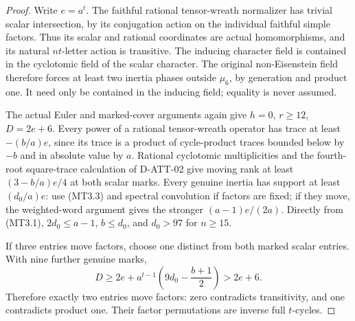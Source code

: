 \begin{proof}
Write $e=a^t$. The faithful rational tensor-wreath normalizer
has trivial scalar intersection, by its conjugation action
on the individual faithful simple factors. Thus its scalar
and rational coordinates are actual homomorphisms, and its
natural $nt$-letter action is transitive. The inducing
character field is contained in the cyclotomic field of
the scalar character. The original non-Eisenstein field
therefore forces at least two inertia phases outside $\mu_6$,
by generation and product one. It need only be contained
in the inducing field; equality is never assumed.

The actual Euler and marked-cover arguments again give
$h=0$, $r\ge12$, $D=2e+6$.
Every power of a rational tensor-wreath operator has trace
at least $-(b/a)e$, since its trace is a product of
cycle-product traces bounded below by $-b$ and in absolute
value by $a$. Rational cyclotomic multiplicities and the
fourth-root square-trace calculation of D-ATT-02 give
moving rank at least $(3-b/a)e/4$ at both scalar marks.
Every genuine inertia has support at least $(d_0/a)e$:
use (MT3.3) and spectral convolution if factors are fixed;
if they move, the weighted-word argument gives the stronger
$(a-1)e/(2a)$. Directly from (MT3.1),
$2d_0\le a-1$, $b\le d_0$, and $d_0>97$ for $n\ge15$.

If three entries move factors, choose one distinct from
both marked scalar entries. With nine further genuine marks,
\[
 D\ge2e+a^{t-1}\left(9d_0-\frac{b+1}{2}\right)>2e+6.
                                                                  \tag{MT3.11}
\]
Therefore exactly two entries move factors: zero contradicts
transitivity, and one contradicts product one. Their factor
permutations are inverse full $t$-cycles.


\end{proof}
